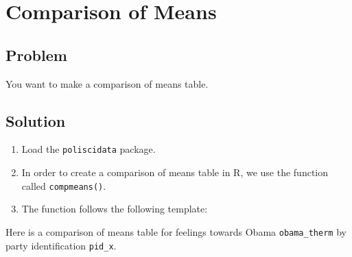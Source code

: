 \documentclass[
]{book}
\newenvironment{Shaded}{\begin{snugshade}}{\end{snugshade}}
\newcommand{\AttributeTok}[1]{\textcolor[rgb]{0.77,0.63,0.00}{#1}}
\newcommand{\CommentTok}[1]{\textcolor[rgb]{0.56,0.35,0.01}{\textit{#1}}}
\newcommand{\FunctionTok}[1]{\textcolor[rgb]{0.00,0.00,0.00}{#1}}
\newcommand{\NormalTok}[1]{#1}
\newcommand{\SpecialCharTok}[1]{\textcolor[rgb]{0.00,0.00,0.00}{#1}}
\providecommand{\tightlist}{%
  \setlength{\itemsep}{0pt}\setlength{\parskip}{0pt}}
\begin{document}
\hypertarget{compmeans}{%
\section{Comparison of Means}\label{compmeans}}

\hypertarget{problem-12}{%
\subsection{Problem}\label{problem-12}}

You want to make a comparison of means table.

\hypertarget{solution-12}{%
\subsection{Solution}\label{solution-12}}

\begin{enumerate}
\def\labelenumi{\arabic{enumi}.}
\tightlist
\item
  Load the \texttt{poliscidata} package.
\item
  In order to create a comparison of means table in R, we use the function called \texttt{compmeans()}.\\
\item
  The function follows the following template:
\end{enumerate}

\begin{Shaded}
\end{Shaded}

Here is a comparison of means table for feelings towards Obama \texttt{obama\_therm} by party identification \texttt{pid\_x}.

\begin{Shaded}
\end{Shaded}
\end{document}
